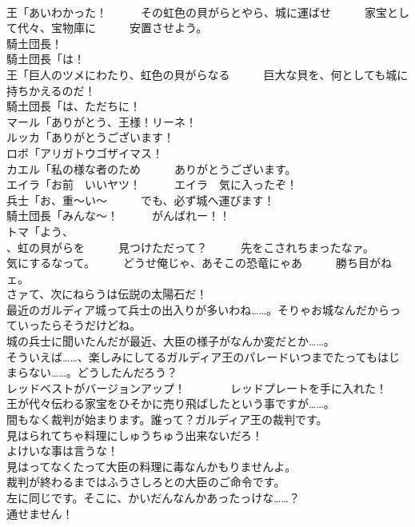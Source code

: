 \documentclass[8pt]{extreport}
\begin{document}
\begin{CJK}{UTF8}{min}
\\	王「あいわかった！　　　その虹色の貝がらとやら、城に運ばせ　　　家宝として代々、宝物庫に　　　安置させよう。	
\\	騎土団長！	
\\	騎土団長「は！	
\\	王「巨人のツメにわたり、虹色の貝がらなる　　　巨大な貝を、何としても城に　　　持ちかえるのだ！	
\\	騎土団長「は、ただちに！	
\\	マール「ありがとう、王様！リーネ！	
\\	ルッカ「ありがとうございます！	
\\	ロボ「アリガトウゴザイマス！	
\\	カエル「私の様な者のため　　　ありがとうございます。	
\\	エイラ「お前　いいヤツ！　　　エイラ　気に入ったぞ！	
\\	兵士「お、重～い～　　　でも、必ず城へ運びます！	
\\	騎土団長「みんな～！　　　がんばれー！！	
\\	トマ「よう、
\\	、虹の貝がらを　　　見つけただって？　　　先をこされちまったなァ。　　　気にするなって。　　　どうせ俺じゃ、あそこの恐竜にゃあ　　　勝ち目がねェ。	
\\	さァて、次にねらうは伝説の太陽石だ！	
\\	最近のガルディア城って兵士の出入りが多いわね……。そりゃお城なんだからっていったらそうだけどね。	
\\	城の兵士に聞いたんだが最近、大臣の様子がなんか変だとか……。	
\\	そういえば……、楽しみにしてるガルディア王のパレードいつまでたってもはじまらない……。どうしたんだろう？	
\\	レッドベストがバージョンアップ！　　　　レッドプレートを手に入れた！	
\\	王が代々伝わる家宝をひそかに売り飛ばしたという事ですが……。	
\\	間もなく裁判が始まります。誰って？ガルディア王の裁判です。	
\\	見はられてちゃ料理にしゅうちゅう出来ないだろ！	
\\	よけいな事は言うな！	
\\	見はってなくたって大臣の料理に毒なんかもりませんよ。	
\\	裁判が終わるまではふうさしろとの大臣のご命令です。	
\\	左に同じです。そこに、かいだんなんかあったっけな……？	
\\	通せません！	

\end{CJK}
\end{document}
